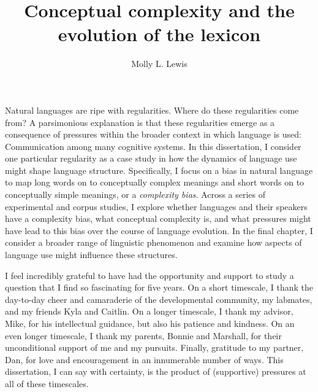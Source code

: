 \documentclass[12pt]{report}
\begin{document}
\title{Conceptual complexity and the evolution of the lexicon}
\author{Molly L. Lewis}
 
\beforepreface 
{}
Natural languages are ripe with regularities. Where do these regularities come from? A parsimonious explanation is that these regularities emerge as a consequence of pressures within the broader context in which language is used: Communication among many cognitive systems. In this dissertation, I consider one particular regularity as a case study in how the dynamics of language use might shape language structure. Specifically, I focus on a bias in natural language to map long words on to conceptually complex meanings and short words on to conceptually simple meanings, or a {\it complexity bias}. Across a series of experimental and corpus studies, I explore whether languages and their speakers have a complexity bias, what conceptual complexity is, and what pressures might have lead to this bias over the course of language evolution. In the final chapter, I consider a broader range of linguistic phenomenon and examine how aspects of language use might influence these structures. 

I feel incredibly grateful to have had the opportunity and support to study a question that I find so fascinating for five years. On a short timescale, I thank the day-to-day cheer and camaraderie of the developmental community, my labmates, and my friends Kyla and Caitlin. On a longer timescale, I thank my advisor, Mike, for his intellectual guidance, but also his patience and kindness. On an even longer timescale, I thank my parents, Bonnie and Marshall, for their unconditional support of me and my pursuits. Finally, gratitude to my partner, Dan, for love and encouragement in an innumerable number of ways. This dissertation, I can say with certainty, is the product of (supportive) pressures at all of these timescales.  



\afterpreface












\end{document}
